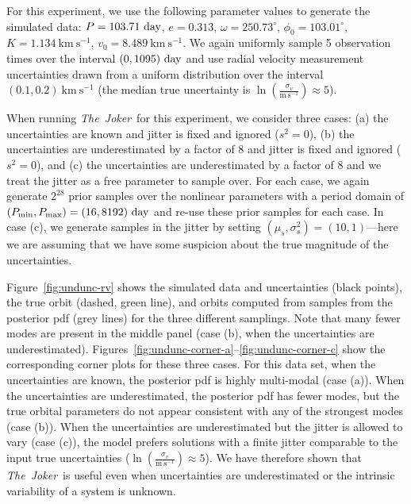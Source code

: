 \documentclass[manuscript, letterpaper]{aastex6}
\newcommand{\project}[1]{\textsl{#1}}
\newcommand{\samplername}{\project{The~Joker}}
\newcommand{\figname}{Figure}
\newcommand{\kms}{\mathrm{km}~\mathrm{s}^{-1}}
\newcommand{\mps}{\mathrm{m}~\mathrm{s}^{-1}}
\begin{document}
For this experiment, we use the following parameter values to generate the
simulated data: $P = 103.71~{\rm day}$, $e = 0.313$, $\omega = 250.73^\circ$,
$\phi_0 = 103.01^\circ$, $K = 1.134~\kms$, $v_0 = 8.489~\kms$.
We again uniformly sample 5 observation times over the interval $(0,1095)~{\rm
day}$ and use radial velocity measurement uncertainties drawn from a uniform
distribution over the interval $(0.1, 0.2)~\kms$ (the median true uncertainty is
$\ln \left(\frac{\sigma_v}{\mps}\right) \approx 5$).

When running \samplername\ for this experiment, we consider three cases:
(a) the uncertainties are known and jitter is fixed and ignored ($s^2=0$), (b)
the uncertainties are underestimated by a factor of 8 and jitter is fixed and
ignored ($s^2=0$), and (c) the uncertainties are underestimated by a factor of 8
and we treat the jitter as a free parameter to sample over.
For each case, we again generate $2^{28}$ prior samples over the nonlinear
parameters with a period domain of $(P_{\rm min}, P_{\rm max}) = (16, 8192)~{\rm
day}$ and re-use these prior samples for each case.
In case (c), we generate samples in the jitter by setting
$(\mu_s,\sigma^2_s) = (10,1)$---here we are assuming that we have some suspicion
about the true magnitude of the uncertainties.

\figname~\ref{fig:undunc-rv} shows the simulated data and uncertainties (black
points), the true orbit (dashed, green line), and orbits computed from samples
from the posterior pdf (grey lines) for the three different samplings.
Note that many fewer modes are present in the middle panel (case (b), when the
uncertainties are underestimated).
\figname s~\ref{fig:undunc-corner-a}--\ref{fig:undunc-corner-c} show the
corresponding corner plots for these three cases.
For this data set, when the uncertainties are known, the posterior pdf is highly
multi-modal (case (a)).
When the uncertainties are underestimated, the posterior pdf has fewer modes,
but the true orbital parameters do not appear consistent with any of the
strongest modes (case (b)).
When the uncertainties are underestimated but the jitter is allowed to vary
(case (c)), the model prefers solutions with a finite jitter comparable to the
input true uncertainties ($\ln \left(\frac{\sigma_v}{\mps}\right) \approx 5$).
We have therefore shown that \samplername\ is useful even when uncertainties are
underestimated or the intrinsic variability of a system is unknown.
\end{document}

